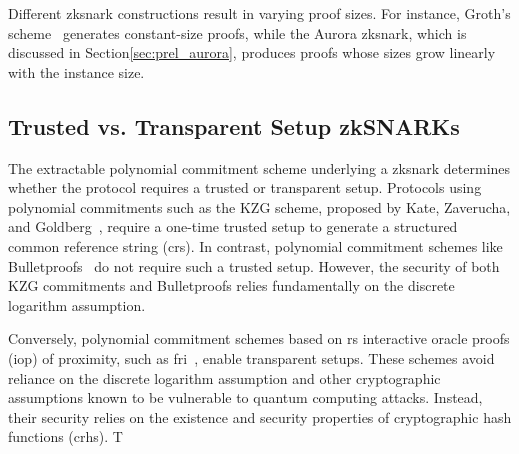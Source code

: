 Different \gls{zksnark} constructions result in varying proof sizes. For instance, Groth's scheme~\cite{Groth2016} generates constant-size proofs, while the Aurora \gls{zksnark}\cite{Aurora2019}, which is discussed in Section\ref{sec:prel_aurora}, produces proofs whose sizes grow linearly with the instance size.

\subsection{Trusted vs. Transparent Setup zkSNARKs}

The extractable polynomial commitment scheme underlying a \gls{zksnark} determines whether the protocol requires a trusted or transparent setup. Protocols using polynomial commitments such as the KZG scheme, proposed by Kate, Zaverucha, and Goldberg~\cite{KZG2010}, require a one-time trusted setup to generate a structured common reference string (\gls{crs}). In contrast, polynomial commitment schemes like Bulletproofs~\cite{Bulletproofs2018} do not require such a trusted setup. However, the security of both KZG commitments and Bulletproofs relies fundamentally on the discrete logarithm assumption.

Conversely, polynomial commitment schemes based on \gls{rs} interactive oracle proofs (\gls{iop}) of proximity, such as \gls{fri}~\cite{FRI2018}, enable transparent setups. These schemes avoid reliance on the discrete logarithm assumption and other cryptographic assumptions known to be vulnerable to quantum computing attacks. Instead, their security relies on the existence and security properties of cryptographic hash functions (\glspl{crh}). T






%

